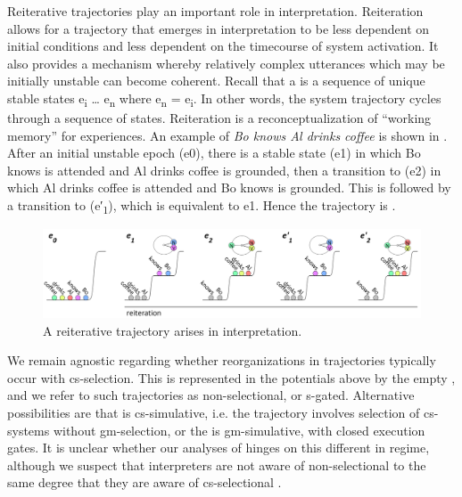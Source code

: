   Reiterative trajectories play an important role in interpretation. Reiteration allows for a trajectory that emerges in interpretation to be less dependent on initial conditions and less dependent on the timecourse of system activation. It also provides a mechanism whereby relatively complex utterances which may be initially unstable can become coherent. Recall that a  is a sequence of unique stable states e\textsubscript{i} … e\textsubscript{n} where e\textsubscript{n} = e\textsubscript{i}. In other words, the system trajectory cycles through a sequence of states. Reiteration is a reconceptualization of “working memory” for  experiences. An example  of \textit{Bo knows Al drinks coffee} is shown in {}. After an initial unstable epoch (e0), there is a stable state (e1) in which {\textbar}Bo knows{\textbar} is attended and {\textbar}Al drinks coffee{\textbar} is grounded, then a transition to (e2) in which {\textbar}Al drinks coffee{\textbar} is attended and {\textbar}Bo knows{\textbar} is grounded. This is followed by a transition to (e′\textsubscript{1}), which is equivalent to e1. Hence the trajectory is .

  
\begin{figure}
\includegraphics[width=\textwidth]{figures/Tilsen-img122.png}
\caption{A reiterative trajectory arises in interpretation.}
\label{fig:6:3}
\end{figure}
 

  We remain agnostic regarding whether reorganizations in  trajectories typically occur with cs-selection. This is represented in the potentials above by the empty , and we refer to such trajectories as non-selectional, or s-gated. Alternative possibilities are that  is cs-simulative, i.e. the trajectory involves selection of cs-systems without gm-selection, or the  is gm-simulative, with closed execution gates. It is unclear whether our analyses of  hinges on this different in regime, although we suspect that interpreters are not aware of non-selectional  to the same degree that they are aware of cs-selectional .  

